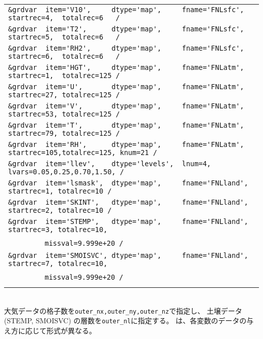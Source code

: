 {{{\begin{tabularx}{150mm}{l}
\verb|&grdvar  item='V10',     dtype='map',     fname='FNLsfc', startrec=4,  totalrec=6   / |  \\
\verb|&grdvar  item='T2',      dtype='map',     fname='FNLsfc', startrec=5,  totalrec=6   / |  \\
\verb|&grdvar  item='RH2',     dtype='map',     fname='FNLsfc', startrec=6,  totalrec=6   / |  \\
\verb|&grdvar  item='HGT',     dtype='map',     fname='FNLatm', startrec=1,  totalrec=125 / |  \\
\verb|&grdvar  item='U',       dtype='map',     fname='FNLatm', startrec=27, totalrec=125 / |  \\
\verb|&grdvar  item='V',       dtype='map',     fname='FNLatm', startrec=53, totalrec=125 / |  \\
\verb|&grdvar  item='T',       dtype='map',     fname='FNLatm', startrec=79, totalrec=125 / |  \\
\verb|&grdvar  item='RH',      dtype='map',     fname='FNLatm', startrec=105,totalrec=125, knum=21 /  |  \\
\verb|&grdvar  item='llev',    dtype='levels',  lnum=4, lvars=0.05,0.25,0.70,1.50, /        |  \\
\verb|&grdvar  item='lsmask',  dtype='map',     fname='FNLland', startrec=1, totalrec=10 /  |  \\
\verb|&grdvar  item='SKINT',   dtype='map',     fname='FNLland', startrec=2, totalrec=10 /  |  \\
\verb|&grdvar  item='STEMP',   dtype='map',     fname='FNLland', startrec=3, totalrec=10,|\\
~~~~~~~~\verb| missval=9.999e+20 /|  \\
\verb|&grdvar  item='SMOISVC', dtype='map',     fname='FNLland', startrec=7, totalrec=10,|\\
~~~~~~~~\verb| missval=9.999e+20 /|  \\
\\
\end{tabularx}
}}}\\


大気データの格子数を\verb|outer_nx,outer_ny,outer_nz|で指定し、
土壌データ(STEMP, SMOISVC) の層数を\verb|outer_nl|に指定する。
は、各変数のデータの与え方に応じて形式が異なる。\\

